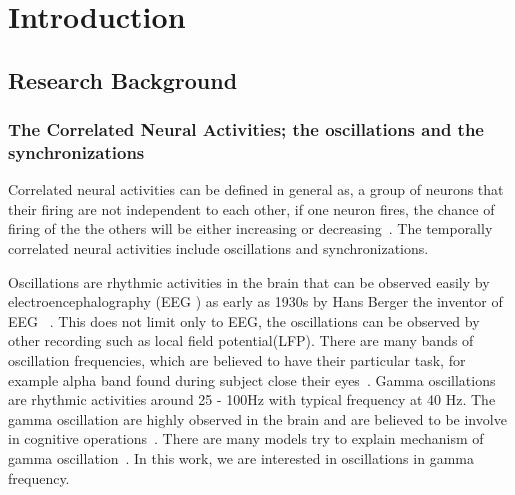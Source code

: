 \chapter{Introduction}




\section{Research Background	}
\subsection{The Correlated Neural Activities; the oscillations and the synchronizations}

Correlated neural activities can be defined in general as, a group of neurons that their firing are not independent to each other, if one neuron fires, the chance of firing of the the others will be either  increasing or decreasing~\cite{salinas2001correlated}. The temporally correlated neural activities include oscillations and synchronizations. 

Oscillations are rhythmic activities in the brain that can be observed easily by electroencephalography (EEG ) as early as 1930s by Hans Berger the inventor of EEG ~\cite{haas2003hans}. This does not limit only to EEG, the oscillations can be observed by other recording such as local field potential(LFP). 
There are many bands of oscillation frequencies, which are believed to have their particular task, for example alpha band found during subject close their eyes~\cite{buzsaki2004neuronal}.  Gamma oscillations are rhythmic activities around 25 - 100Hz with typical frequency at 40 Hz. The gamma oscillation are highly observed in the brain and are believed to be involve in cognitive operations~\cite{singer1995visual, engel2001temporal, fries2005mechanism}.  There are many models try to explain mechanism of gamma oscillation~\cite{wang1996gamma,whittington1995synchronized,  wilson1972excitatory, brunel2003determines,gray1996chattering, buzsaki2012mechanisms}.  In this work, we are interested in oscillations in gamma frequency.


